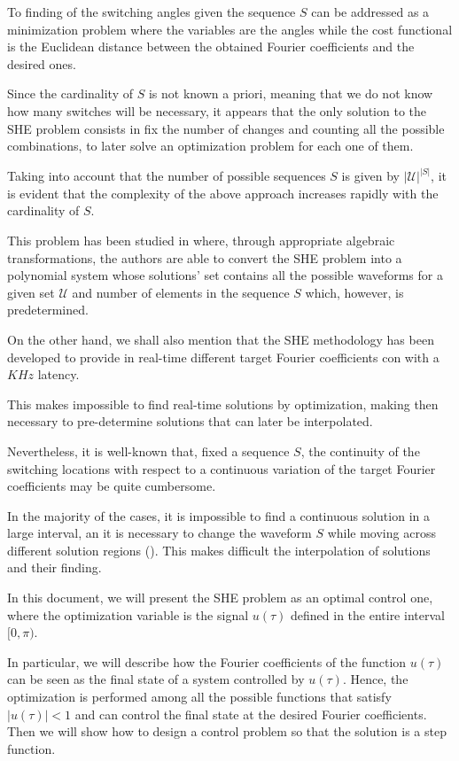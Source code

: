 To finding of the switching angles given the sequence $S$ can be addressed as a minimization problem where the variables are the angles while the cost functional is the Euclidean distance between the obtained Fourier coefficients and the desired ones.

Since the cardinality of $S$ is not known a priori, meaning that we do not know how many switches will be necessary, it appears that the only solution to the SHE problem consists in fix the number of changes and counting all the possible combinations, to later solve an optimization problem for each one of them.

Taking into account that the number of possible sequences $S$ is given by $|\mathcal{U}|^{|S|}$, it is evident that the complexity of the above approach increases rapidly with the cardinality of $S$.
 
This problem has been studied in \cite{Yang2015} where, through appropriate algebraic transformations, the authors are able to convert the SHE problem into a polynomial system whose solutions' set contains all the possible waveforms for a given set $\mathcal{U}$ and number of elements in the sequence $S$ which, however, is predetermined. 

On the other hand, we shall also mention that the SHE methodology has been developed to provide in real-time different target Fourier coefficients con with a $KHz$ latency. 

This makes impossible to find real-time solutions by optimization, making then necessary to pre-determine solutions that can later be interpolated.

Nevertheless, it is well-known that, fixed a sequence $S$, the continuity of the switching locations with respect to a continuous variation of the target Fourier coefficients may be quite cumbersome. 

In the majority of the cases, it is impossible to find a continuous solution in a large interval, an it is necessary to change the waveform $S$ while moving across different solution regions (\cite{Yang2015,Yang2017}). This makes difficult the interpolation of solutions and their finding.

In this document, we will present the SHE problem as an optimal control one, where the optimization variable is the signal $u(\tau)$ defined in the entire interval $[0,\pi)$. 

In particular, we will describe how the Fourier coefficients of the function $u(\tau)$ can be seen as the final state of a system controlled by $u (\tau)$. Hence, the optimization is performed among all the possible functions that satisfy $|u(\tau)|<1 $ and can control the final state at the desired Fourier coefficients. Then we will show how to design a control problem so that the solution is a step function.

